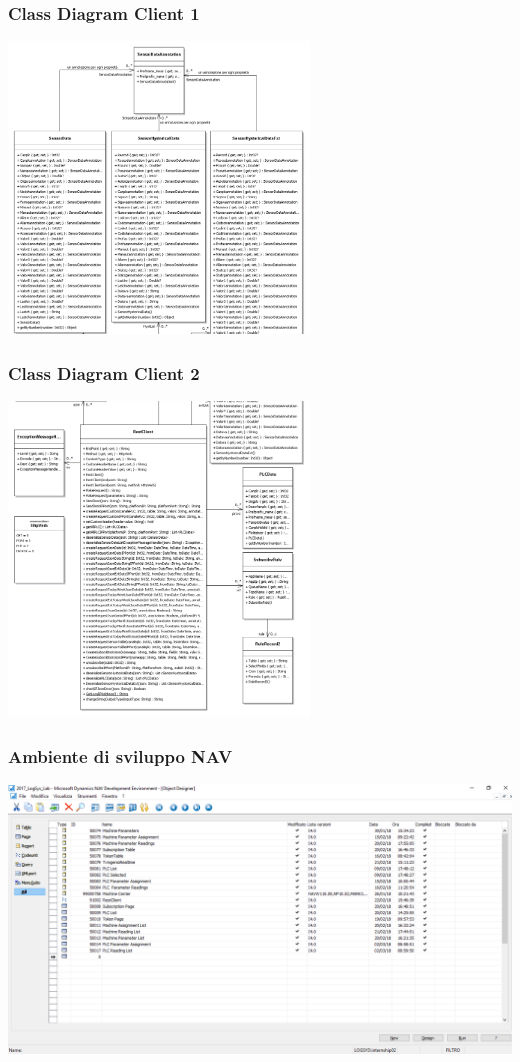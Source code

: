 \documentclass{beamer}
\begin{document}
\begin{frame}
\frametitle{Class Diagram Client 1}
\includegraphics[width=0.6\textwidth]{images/ClassDiagramParte1.png}
\end{frame}

\begin{frame}
\frametitle{Class Diagram Client 2}
\includegraphics[width=0.6\textwidth]{images/ClassDiagramParte2.png}
\end{frame}

\begin{frame}
\frametitle{Ambiente di sviluppo NAV}
\includegraphics[width=1\textwidth]{images/NAVDevelopmentEnvironment.png}
\end{frame}
\end{document}
